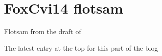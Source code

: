 

    \section{FoxCvi14 flotsam}
    \label{sect:FoxCvi14}

Flotsam from the draft of 
\bigskip

\noindent
{\color{red} The latest entry at the top for this part of the blog}

\bigskip\bigskip


\begin{description}




\end{description}
